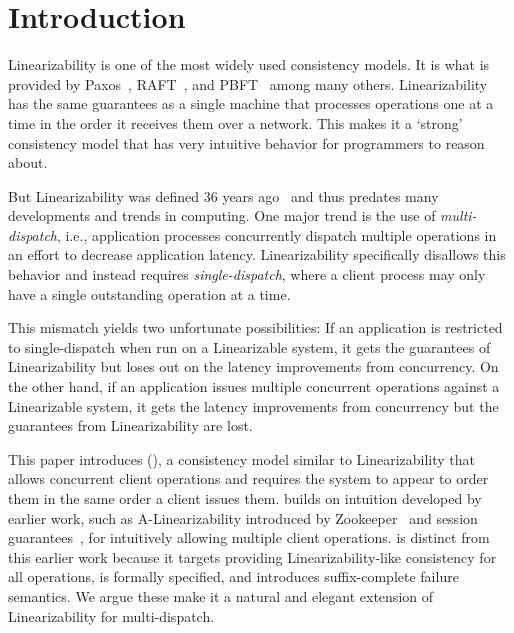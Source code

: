 \section{Introduction}
\label{sec:intro}




Linearizability is one of the most widely used consistency models.
It is what is provided by Paxos~\cite{lamport1998paxos}, RAFT~\cite{ongaro2014raft}, and PBFT~\cite{castro1999pbft} among many others.
Linearizability has the same guarantees as a single machine that processes operations one at a time in the order it receives them over a network.
This makes it a `strong' consistency model that has very intuitive behavior for programmers to reason about.

But Linearizability was defined 36 years ago~\cite{herlihy1990linearizability,herlihy1987linearizability} and thus predates many developments and trends in computing.
One major trend is the use of \textit{multi-dispatch}, i.e., application processes concurrently dispatch multiple operations in an effort to
decrease application latency.
Linearizability specifically disallows this behavior and instead requires \textit{single-dispatch}, where a client process may only have a single outstanding operation at a time.

This mismatch yields two unfortunate possibilities:
If an application is restricted to single-dispatch when run on a Linearizable system, it gets the guarantees of Linearizability but loses out on the latency improvements from concurrency.
On the other hand, if an application issues multiple concurrent operations against a Linearizable system, it gets the latency improvements from concurrency but the guarantees from Linearizability are lost.

This paper introduces \mdllong{} (\mdl{}), a consistency model similar to Linearizability that allows concurrent client operations and requires the system to appear to order them in the same order a client issues them.
\Mdl{} builds on intuition developed by earlier work, such as A-Linearizability introduced by Zookeeper~\cite{hunt2010zookeeper} and session guarantees~\cite{terry1994session}, for intuitively allowing multiple client operations.
\Mdl{} is distinct from this earlier work because it targets providing Linearizability-like consistency for all operations, is formally specified, and introduces suffix-complete failure semantics.
We argue these make it a natural and elegant extension of Linearizability for multi-dispatch.


